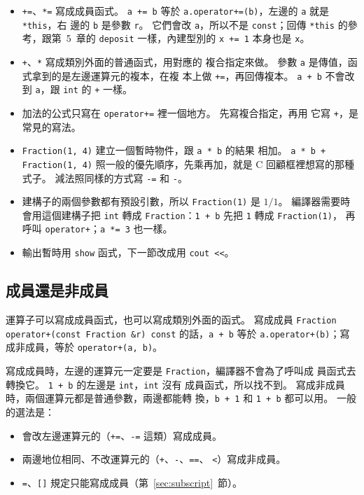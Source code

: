 \begin{itemize}
\item \texttt{+=}、\texttt{*=} 寫成成員函式。 \texttt{a += b}
等於 \texttt{a.operator+=(b)}，左邊的 \texttt{a} 就是 \texttt{*this}，右
邊的 \texttt{b} 是參數 \texttt{r}。 它們會改 \texttt{a}，所以不是
\texttt{const}；回傳 \texttt{*this} 的參考，跟第~5~章的
\texttt{deposit} 一樣，內建型別的 \texttt{x += 1} 本身也是 \texttt{x}。
\item \texttt{+}、\texttt{*} 寫成類別外面的普通函式，用對應的
複合指定來做。 參數 \texttt{a} 是傳值，函式拿到的是左邊運算元的複本，在複
本上做 \texttt{+=}，再回傳複本。 \texttt{a + b} 不會改到 \texttt{a}，跟
\texttt{int} 的 \texttt{+} 一樣。
\item 加法的公式只寫在 \texttt{operator+=} 裡一個地方。 先寫複合指定，再用
它寫 \texttt{+}，是常見的寫法。
\item \texttt{Fraction(1, 4)} 建立一個暫時物件，跟 \texttt{a * b} 的結果
相加。 \texttt{a * b + Fraction(1, 4)} 照一般的優先順序，先乘再加，就是
C 回顧框裡想寫的那種式子。 減法照同樣的方式寫 \texttt{-=} 和 \texttt{-}。
\item 建構子的兩個參數都有預設引數，所以 \texttt{Fraction(1)} 是
$1/1$。 編譯器需要時會用這個建構子把 \texttt{int} 轉成
\texttt{Fraction}：\texttt{1 + b} 先把 \texttt{1} 轉成 \texttt{Fraction(1)}，
再呼叫 \texttt{operator+}；\texttt{a *= 3} 也一樣。
\item 輸出暫時用 \texttt{show} 函式，下一節改成用 \texttt{cout <<}。
\end{itemize}

\subsection{成員還是非成員}

運算子可以寫成成員函式，也可以寫成類別外面的函式。 寫成成員
\texttt{Fraction operator+(const Fraction \&r) const} 的話，\texttt{a + b}
等於 \texttt{a.operator+(b)}；寫成非成員，等於 \texttt{operator+(a, b)}。

寫成成員時，左邊的運算元一定要是 \texttt{Fraction}，編譯器不會為了呼叫成
員函式去轉換它。 \texttt{1 + b} 的左邊是 \texttt{int}，\texttt{int} 沒有
成員函式，所以找不到。 寫成非成員時，兩個運算元都是普通參數，兩邊都能轉
換，\texttt{b + 1} 和 \texttt{1 + b} 都可以用。 一般的選法是：

\begin{itemize}
\item 會改左邊運算元的（\texttt{+=}、\texttt{-=} 這類）寫成成員。
\item 兩邊地位相同、不改運算元的（\texttt{+}、\texttt{-}、\texttt{==}、
\texttt{<}）寫成非成員。
\item \texttt{=}、\texttt{[]} 規定只能寫成成員（第~\ref{sec:subscript}~節）。
\end{itemize}

